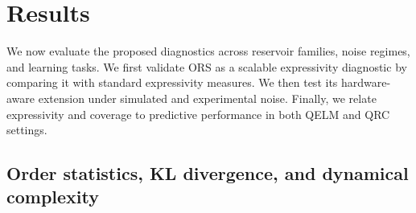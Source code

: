 \documentclass[
    aps,
    pre,
    amsmath,
    amssymb,
    reprint,
    superscriptaddress,
    preprintnumbers,
]{revtex4-2}
\begin{document}
\section{Results}
\label{sec:results}

We now evaluate the proposed diagnostics across reservoir families, noise regimes, and learning tasks. We first validate ORS as a scalable expressivity diagnostic by comparing it with standard expressivity measures. We then test its hardware-aware extension under simulated and experimental noise. Finally, we relate expressivity and coverage to predictive performance in both QELM and QRC settings.

\subsection{Order statistics, KL divergence, and dynamical complexity}
\label{sec:results-kl-ors}
\end{document}
